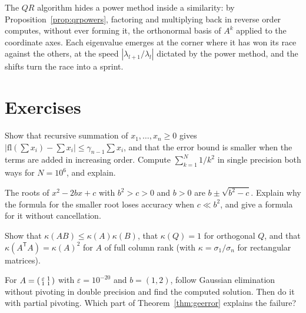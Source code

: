 \begin{beauty}
The $QR$ algorithm hides a power method inside a similarity: by Proposition~\ref{prop:qrpowers}, factoring and multiplying back in reverse order
computes, without ever forming it, the orthonormal basis of $A^k$ applied to the coordinate axes. Each eigenvalue emerges at the corner where it has
won its race against the others, at the speed $|\lambda_{l+1}/\lambda_l|$ dictated by the power method, and the shifts turn the race into a sprint.
\end{beauty}

\section{Exercises}

\begin{exercise}[$\star$]\label{ex:summation}
Show that recursive summation of $x_1,\dots,x_n\ge0$ gives $|\mathrm{fl}(\sum x_i)-\sum x_i|\le\gamma_{n-1}\sum x_i$, and that the error bound is smaller
when the terms are added in increasing order. Compute $\sum_{k=1}^{N}1/k^2$ in single precision both ways for $N=10^6$, and explain.
\end{exercise}

\begin{exercise}[$\star$]\label{ex:quadratic}
The roots of $x^2-2bx+c$ with $b^2>c>0$ and $b>0$ are $b\pm\sqrt{b^2-c}$. Explain why the formula for the smaller root loses accuracy when $c\ll b^2$, and
give a formula for it without cancellation.
\end{exercise}

\begin{exercise}[$\star$]\label{ex:condprops}
Show that $\kappa(AB)\le\kappa(A)\kappa(B)$, that $\kappa(Q)=1$ for orthogonal $Q$, and that $\kappa(A^{\mathsf T}A)=\kappa(A)^2$ for $A$ of full column rank
(with $\kappa=\sigma_1/\sigma_n$ for rectangular matrices).
\end{exercise}

\begin{exercise}[$\star$]\label{ex:nopivot}
For $A=\begin{psmallmatrix}\varepsilon&1\\1&1\end{psmallmatrix}$ with $\varepsilon=10^{-20}$ and $b=(1,2)$, follow Gaussian elimination without pivoting in
double precision and find the computed solution. Then do it with partial pivoting. Which part of Theorem~\ref{thm:geerror} explains the failure?
\end{exercise}

